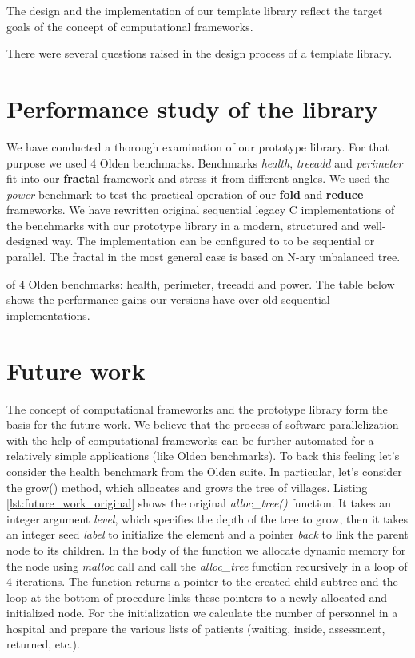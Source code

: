 \quad The design and the implementation of our template library reflect the target goals of the concept of computational frameworks.    

\quad There were several questions raised in the design process of a template library. 

\section{Performance study of the library}
\label{frameworks_performance_study}
\quad We have conducted a thorough examination of our prototype library. For that purpose we used 4 Olden benchmarks. Benchmarks \textit{health}, \textit{treeadd} and \textit{perimeter} fit into our \textbf{fractal} framework and stress it from different angles. We used the \textit{power} benchmark to test the practical operation of our \textbf{fold} and \textbf{reduce} frameworks.\newline\null
\quad We have rewritten original sequential legacy C implementations of the benchmarks with our prototype library in a modern, structured and well-designed way. The implementation can be configured to to be sequential or parallel. The fractal in the most general case is based on N-ary unbalanced tree.   


of 4 Olden benchmarks: health, perimeter, treeadd and power. The table below shows the performance gains our versions have over old sequential implementations.   

\section{Future work}
\label{frameworks_future_work}
\quad The concept of computational frameworks and the prototype library form the basis for the future work. We believe that the process of software parallelization with the help of computational frameworks can be further automated for a relatively simple applications (like Olden benchmarks). To back this feeling let's consider the health benchmark from the Olden suite. In particular, let's consider the grow() method, which allocates and grows the tree of villages.
\quad Listing \ref{lst:future_work_original} shows the original \textit{alloc\_tree()} function. It takes an integer argument \textit{level}, which specifies the depth of the tree to grow, then it takes an integer seed \textit{label} to initialize the element and a pointer \textit{back} to link the parent node to its children. In the body of the function we allocate dynamic memory for the node using \textit{malloc} call and call the \textit{alloc\_tree} function recursively in a loop of 4 iterations. The function returns a pointer to the created child subtree and the loop at the bottom of procedure links these pointers to a newly allocated and initialized node. For the initialization we calculate the number of personnel in a hospital and prepare the various lists of patients (waiting, inside, assessment, returned, etc.).\newline\null

